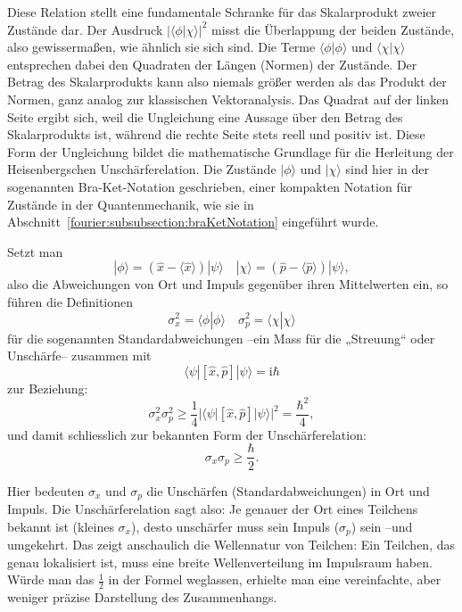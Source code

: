 Diese Relation stellt eine fundamentale Schranke für das Skalarprodukt zweier Zustände dar.
Der Ausdruck $|\langle\phi|\chi\rangle|^2$ misst die Überlappung der beiden Zustände, also gewissermaßen, wie ähnlich sie sich sind.
Die Terme $\langle\phi|\phi\rangle$ und $\langle\chi|\chi\rangle$ entsprechen dabei den Quadraten der Längen (Normen) der Zustände.
Der Betrag des Skalarprodukts kann also niemals größer werden als das Produkt der Normen, ganz analog zur klassischen Vektoranalysis.
Das Quadrat auf der linken Seite ergibt sich, weil die Ungleichung eine Aussage über den Betrag des Skalarprodukts ist, während die rechte Seite stets reell und positiv ist.
Diese Form der Ungleichung bildet die mathematische Grundlage für die Herleitung der Heisenbergschen Unschärferelation.
Die Zustände $|\phi\rangle$ und $|\chi\rangle$ sind hier in der sogenannten Bra-Ket-Notation geschrieben, einer kompakten Notation für Zustände in der Quantenmechanik, wie sie in Abschnitt~\ref{fourier:subsubsection:braKetNotation} eingeführt wurde.

Setzt man
\begin{equation}
	|\phi\rangle = (\hat{x} - \langle \hat{x} \rangle) |\psi\rangle \quad |\chi\rangle = (\hat{p} - \langle \hat{p} \rangle) | \psi\rangle,
\end{equation}
also die Abweichungen von Ort und Impuls gegenüber ihren Mittelwerten ein, so führen die Definitionen
\begin{equation}
	\sigma_x^2 = \langle\phi | \phi\rangle \quad \sigma_p^2 = \langle\chi | \chi\rangle
\end{equation}
für die sogenannten Standardabweichungen --ein Mass für die „Streuung“ oder Unschärfe-- zusammen mit
\begin{equation}
	\langle\psi | [\hat{x},\hat{p}] | \psi\rangle = \mathrm{i}\hbar
\end{equation}
zur Beziehung:
\begin{equation}
	\sigma_x^2 \sigma_p^2 \ge \frac{1}{4} |\langle\psi | [\hat{x},\hat{p}] | \psi\rangle|^2 = \frac{\hbar^2}{4},
\end{equation}
und damit schliesslich zur bekannten Form der Unschärferelation:
\begin{equation}
	\sigma_x \sigma_p \ge \frac{\hbar}{2}.
\end{equation}

Hier bedeuten $\sigma_x$ und $\sigma_p$ die Unschärfen (Standardabweichungen) in Ort und Impuls.
Die Unschärferelation sagt also:
Je genauer der Ort eines Teilchens bekannt ist (kleines $\sigma_x$), desto unschärfer muss sein Impuls ($\sigma_p$) sein --und umgekehrt.
Das zeigt anschaulich die Wellennatur von Teilchen:
Ein Teilchen, das genau lokalisiert ist, muss eine breite Wellenverteilung im Impulsraum haben.
Würde man das $\tfrac{1}{2}$ in der Formel weglassen, erhielte man eine vereinfachte, aber weniger präzise Darstellung des Zusammenhangs.

